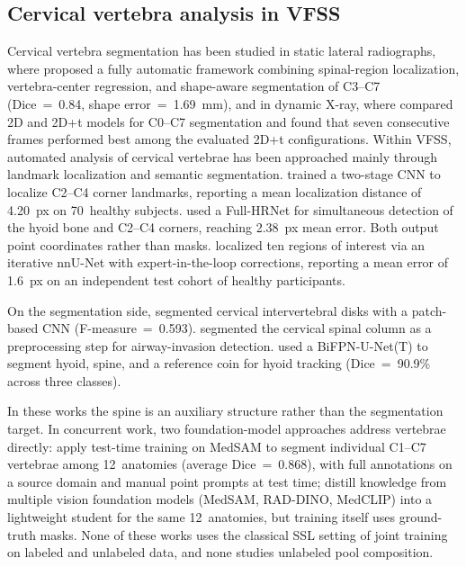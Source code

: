 \documentclass[a4paper,fleqn]{cas-dc}
\begin{document}
\subsection{Cervical vertebra analysis in VFSS}

Cervical vertebra segmentation has been studied in static lateral radiographs, where \citet{ref_alarif2018} proposed a fully automatic framework combining spinal-region localization, vertebra-center regression, and shape-aware segmentation of C3--C7 (Dice~=~0.84, shape error~=~1.69~mm), and in dynamic X-ray, where \citet{ref_santbrink2025} compared 2D and 2D+t models for C0--C7 segmentation and found that seven consecutive frames performed best among the evaluated 2D+t configurations.
Within VFSS, automated analysis of cervical vertebrae has been approached mainly through landmark localization and semantic segmentation.
\citet{ref_zhang2021} trained a two-stage CNN to localize C2--C4 corner landmarks, reporting a mean localization distance of 4.20~px on 70~healthy subjects.
\citet{ref_li2024} used a Full-HRNet for simultaneous detection of the hyoid bone and C2--C4 corners, reaching 2.38~px mean error.
Both output point coordinates rather than masks.
\citet{ref_cubero2025} localized ten regions of interest via an iterative nnU-Net with expert-in-the-loop corrections, reporting a mean error of 1.6~px on an independent test cohort of healthy participants.

On the segmentation side, \citet{ref_fujinaka} segmented cervical intervertebral disks with a patch-based CNN (F-measure~=~0.593).
\citet{ref_lee2020} segmented the cervical spinal column as a preprocessing step for airway-invasion detection.
\citet{ref_kim2021} used a BiFPN-U-Net(T) to segment hyoid, spine, and a reference coin for hyoid tracking (Dice~=~90.9\% across three classes).

In these works the spine is an auxiliary structure rather than the segmentation target.
In concurrent work, two foundation-model approaches address vertebrae directly: \citet{ref_zeng_ttt} apply test-time training on MedSAM to segment individual C1--C7 vertebrae among 12~anatomies (average Dice~=~0.868), with full annotations on a source domain and manual point prompts at test time; \citet{ref_zeng_distill2025} distill knowledge from multiple vision foundation models (MedSAM, RAD-DINO, MedCLIP) into a lightweight student for the same 12~anatomies, but training itself uses ground-truth masks.
None of these works uses the classical SSL setting of joint training on labeled and unlabeled data, and none studies unlabeled pool composition.
\end{document}
